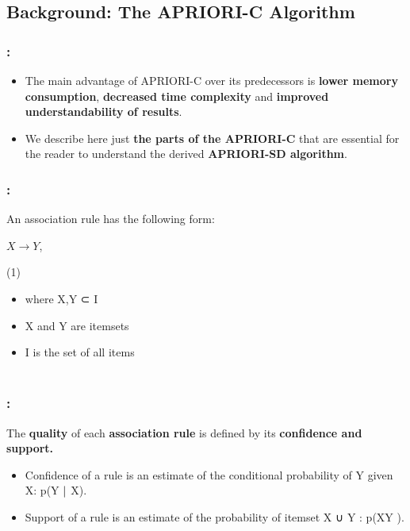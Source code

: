 \documentclass{beamer}
\begin{document}
\begin{CJK*}{UTF8}{bsmi}
\section{ Background: The APRIORI-C Algorithm} 
\begin{frame}
	\frametitle{\insertsection : \insertsubsection}
		\begin{itemize}
			\item The main advantage of APRIORI-C over its predecessors is \textbf{lower memory consumption}, \textbf{decreased time complexity} and \textbf{improved understandability of results}.
			\item We describe here just \textbf{the parts of the APRIORI-C} that are essential for the reader to understand the derived \textbf{APRIORI-SD algorithm}.
		\end{itemize}
\end{frame}
\begin{frame}
	\frametitle{\insertsection : \insertsubsection}
	\begin{block}{An association rule has the following form: }
		~\\
	\begin{center} $ 	X\longrightarrow Y $,\\	\end{center}
		\begin{flushright}
			(1)
		\end{flushright}
		\begin{itemize}
			\item  where X,Y ⊂ I
			\item X and Y are itemsets
			\item I is the set of all items\\
			~\\
		\end{itemize}
	\end{block}
\end{frame}
\begin{frame}
	\frametitle{\insertsection : \insertsubsection}
	The \textbf{quality} of each \textbf{association rule }is defined by its \textbf{confidence and support.}\\
	\begin{itemize}
		\item  Confidence of a rule is an estimate of the conditional probability of Y given X: p(Y $ \arrowvert $ X).
		\item  Support of a rule is an estimate of the probability of itemset X ∪ Y : p(XY ). 
		\end{itemize}

\end{frame}
\end{CJK*}
\end{document}
